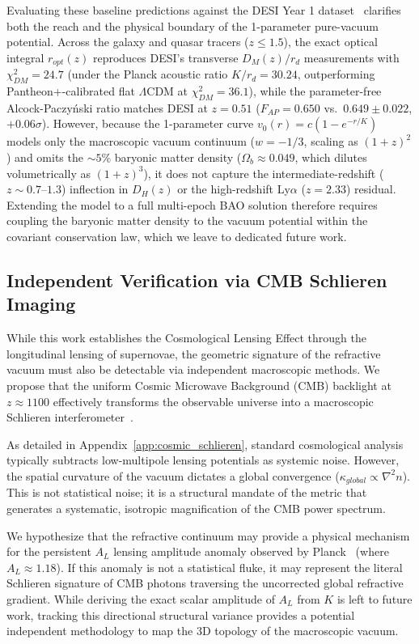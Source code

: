 \documentclass[11pt]{article}
\begin{document}
Evaluating these baseline predictions against the DESI Year 1 dataset~\cite{Adame2024} clarifies both the reach and the physical boundary of the 1-parameter pure-vacuum potential. Across the galaxy and quasar tracers ($z \le 1.5$), the exact optical integral $r_{opt}(z)$ reproduces DESI's transverse $D_M(z)/r_d$ measurements with $\chi^2_{DM} = 24.7$ (under the Planck acoustic ratio $K/r_d = 30.24$, outperforming Pantheon+-calibrated flat $\Lambda$CDM at $\chi^2_{DM} = 36.1$), while the parameter-free Alcock-Paczy\'nski ratio matches DESI at $z = 0.51$ ($F_{AP} = 0.650$ vs.\ $0.649 \pm 0.022$, $+0.06\sigma$). However, because the 1-parameter curve $v_0(r) = c(1 - e^{-r/K})$ models only the macroscopic vacuum continuum ($w = -1/3$, scaling as $(1+z)^2$) and omits the $\sim 5\%$ baryonic matter density ($\Omega_b \approx 0.049$, which dilutes volumetrically as $(1+z)^3$), it does not capture the intermediate-redshift ($z \sim 0.7\text{--}1.3$) inflection in $D_H(z)$ or the high-redshift Ly$\alpha$ ($z = 2.33$) residual. Extending the model to a full multi-epoch BAO solution therefore requires coupling the baryonic matter density to the vacuum potential within the covariant conservation law, which we leave to dedicated future work.

\subsection{Independent Verification via CMB Schlieren Imaging}
While this work establishes the Cosmological Lensing Effect through the longitudinal lensing of supernovae, the geometric signature of the refractive vacuum must also be detectable via independent macroscopic methods. We propose that the uniform Cosmic Microwave Background (CMB) backlight at $z \approx 1100$ effectively transforms the observable universe into a macroscopic Schlieren interferometer~\cite{Toepler1864}.

As detailed in Appendix~\ref{app:cosmic_schlieren}, standard cosmological analysis typically subtracts low-multipole lensing potentials as systemic noise. However, the spatial curvature of the vacuum dictates a global convergence ($\kappa_{global} \propto \nabla^2 n$). This is not statistical noise; it is a structural mandate of the metric that generates a systematic, isotropic magnification of the CMB power spectrum.

We hypothesize that the refractive continuum may provide a physical mechanism for the persistent $A_L$ lensing amplitude anomaly observed by Planck~\cite{Planck2018} (where $A_L \approx 1.18$). If this anomaly is not a statistical fluke, it may represent the literal Schlieren signature of CMB photons traversing the uncorrected global refractive gradient. While deriving the exact scalar amplitude of $A_L$ from $K$ is left to future work, tracking this directional structural variance provides a potential independent methodology to map the 3D topology of the macroscopic vacuum.
\end{document}
